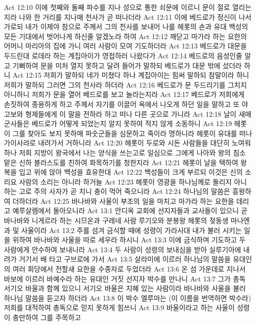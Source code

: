Act 12:10  이에 첫째와 둘째 파수를 지나 성으로 통한 쇠문에 이르니 문이 절로 열리는지라 나와 한 거리를 지나매 천사가 곧 떠나더라
Act 12:11  이에 베드로가 정신이 나서 가로되 내가 이제야 참으로 주께서 그의 천사를 보내어 나를 헤롯의 손과 유대 백성의 모든 기대에서 벗어나게 하신줄 알겠노라 하여
Act 12:12  깨닫고 마가라 하는 요한의 어머니 마리아의 집에 가니 여러 사람이 모여 기도하더라
Act 12:13  베드로가 대문을 두드린대 로데라 하는 계집아이가 영접하러 나왔다가
Act 12:14  베드로의 음성인줄 알고 기뻐하여 문을 미처 열지 못하고 달려 들어가 말하되 베드로가 대문 밖에 섰더라 하니
Act 12:15  저희가 말하되 네가 미쳤다 하나 계집아이는 힘써 말하되 참말이라 하니 저희가 말하되 그러면 그의 천사라 하더라
Act 12:16  베드로가 문 두드리기를 그치지 아니하니 저희가 문을 열어 베드로를 보고 놀라는지라
Act 12:17  베드로가 저희에게 손짓하여 종용하게 하고 주께서 자기를 이끌어 옥에서 나오게 하던 일을 말하고 또 야고보와 형제들에게 이 말을 전하라 하고 떠나 다른 곳으로 가니라
Act 12:18  날이 새매 군사들은 베드로가 어떻게 되었는지 알지 못하여 적지 않게 소동하니
Act 12:19  헤롯이 그를 찾아도 보지 못하매 파숫군들을 심문하고 죽이라 명하니라 헤롯이 유대를 떠나 가이사랴로 내려가서 거하니라
Act 12:20  헤롯이 두로와 시돈 사람들을 대단히 노여워하나 저희 지방이 왕국에서 나는 양식을 쓰는고로 일심으로 그에게 나아와 왕의 침소 맡은 신하 블라스도를 친하여 화목하기를 청한지라
Act 12:21  헤롯이 날을 택하여 왕복을 입고 위에 앉아 백성을 효유한대
Act 12:22  백성들이 크게 부르되 이것은 신의 소리요 사람의 소리는 아니라 하거늘
Act 12:23  헤롯이 영광을 하나님께로 돌리지 아니하는 고로 주의 사자가 곧 치니 충이 먹어 죽으니라
Act 12:24  하나님의 말씀은 흥왕하여 더하더라
Act 12:25  바나바와 사울이 부조의 일을 마치고 마가라 하는 요한을 데리고 예루살렘에서 돌아오니라
Act 13:1  안디옥 교회에 선지자들과 교사들이 있으니 곧 바나바와 니게르라 하는 시므온과 구레네 사람 루기오와 분봉왕 헤롯의 젖동생 마나엔과 및 사울이라
Act 13:2  주를 섬겨 금식할 때에 성령이 가라사대 내가 불러 시키는 일을 위하여 바나바와 사울을 따로 세우라 하시니
Act 13:3  이에 금식하며 기도하고 두 사람에게 안수하여 보내니라
Act 13:4  두 사람이 성령의 보내심을 받아 실루기아에 내려가 거기서 배 타고 구브로에 가서
Act 13:5  살라미에 이르러 하나님의 말씀을 유대인의 여러 회당에서 전할새 요한을 수종자로 두었더라
Act 13:6  온 섬 가운데로 지나서 바보에 이르러 바예수라 하는 유대인 거짓 선지자 박수를 만나니
Act 13:7  그가 총독 서기오 바울과 함께 있으니 서기오 바울은 지혜 있는 사람이라 바나바와 사울을 불러 하나님 말씀을 듣고자 하더라
Act 13:8  이 박수 엘루마는 (이 이름을 번역하면 박수라) 저희를 대적하여 총독으로 믿지 못하게 힘쓰니
Act 13:9  바울이라고 하는 사울이 성령이 충만하여 그를 주목하고
